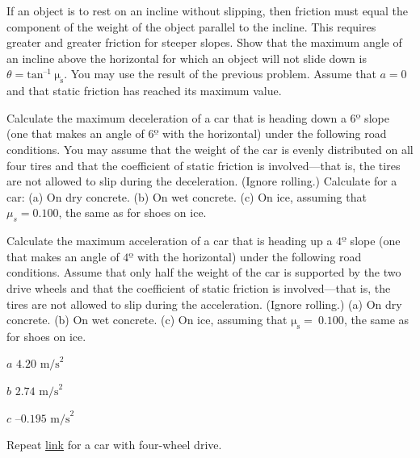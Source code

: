 \documentclass[
]{book}
\begin{document}
\hypertarget{fs-id1736769}{}
\leavevmode{}%
If an object is to rest on an incline without slipping, then friction
must equal the component of the weight of the object parallel to the
incline. This requires greater and greater friction for steeper slopes.
Show that the maximum angle of an incline above the horizontal for which
an object will not slide down is
\(\theta = \text{tan}^{\text{–1}}\ \text{μ}_{\text{s}}\). You may use the
result of the previous problem. Assume that \(a = \text{0}\) and that
static friction has reached its maximum value.

\hypertarget{fs-id855543}{}
\leavevmode{}%
Calculate the maximum deceleration of a car that is heading down a
\(6º{}\) slope (one that makes an angle of \(6º{}\) with the horizontal)
under the following road conditions. You may assume that the weight of
the car is evenly distributed on all four tires and that the coefficient
of static friction is involved---that is, the tires are not allowed to
slip during the deceleration. (Ignore rolling.) Calculate for a car: (a)
On dry concrete. (b) On wet concrete. (c) On ice, assuming that
\({{\mu_{s} = 0}\text{.}\text{100}}{}\), the same as for shoes on ice.

\hypertarget{fs-id1924033}{}
\leavevmode{}%
Calculate the maximum acceleration of a car that is heading up a
\(\text{4º}\) slope (one that makes an angle of \(\text{4º}\) with the
horizontal) under the following road conditions. Assume that only half
the weight of the car is supported by the two drive wheels and that the
coefficient of static friction is involved---that is, the tires are not
allowed to slip during the acceleration. (Ignore rolling.) (a) On dry
concrete. (b) On wet concrete. (c) On ice, assuming that
\(\text{μ}_{\text{s}} = \ \text{0.100}\), the same as for shoes on ice.

\leavevmode{}%
\(a\) \({4\text{.}\text{20\ m/s}^{2}}{}\)

\(b\) \({2\text{.}\text{74\ m/s}^{2}}{}\)

\(c\) \({\text{–0}\text{.}\text{195\ m/s}^{2}}{}\)

\hypertarget{fs-id1742423}{}
\leavevmode{}%
Repeat \protect\hyperlink{fs-id1924033}{link} for a car with
four-wheel drive.
\end{document}
